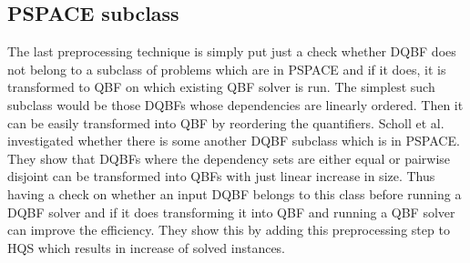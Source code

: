 \documentclass[
  digital, %
  twoside, %
  table,   %
  nolof,     %
  nolot,     %
]{fithesis3}
\theoremstyle{definition}
\theoremstyle{remark}
\begin{document}
\subsection{PSPACE subclass}
The last preprocessing technique is simply put just a check whether DQBF does not belong to a subclass of problems which are in PSPACE and if it does, it is transformed to QBF on which existing QBF solver is run. The simplest such subclass would be those DQBFs whose dependencies are linearly ordered. Then it can be easily transformed into QBF by reordering the quantifiers. Scholl et al.~\cite{PSPACEsubclass} investigated whether there is some another DQBF subclass which is in PSPACE. They show that DQBFs where the dependency sets are either equal or pairwise disjoint can be transformed into QBFs with just linear increase in size. Thus having a check on whether an input DQBF belongs to this class before running a DQBF solver and if it does transforming it into QBF and running a QBF solver can improve the efficiency. They show this by adding this preprocessing step to HQS which results in increase of solved instances.




\end{document}
